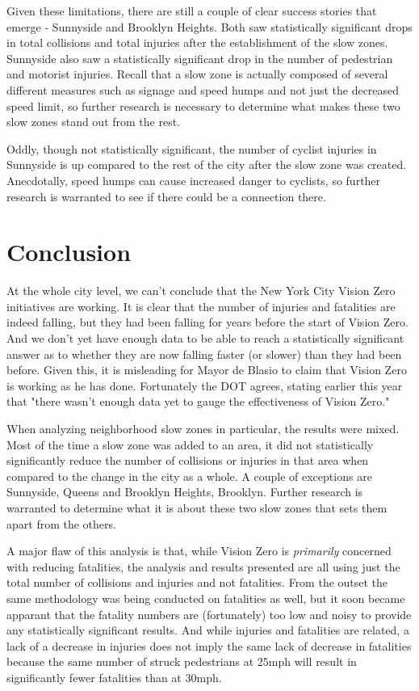 \documentclass[10pt,journal,compsoc]{IEEEtran}
\begin{document}
Given these limitations, there are still a couple of clear success stories that emerge - Sunnyside and Brooklyn Heights.  Both saw statistically significant drops in total collisions and total injuries after the establishment of the slow zones.  Sunnyside also saw a statistically significant drop in the number of pedestrian and motorist injuries.  Recall that a slow zone is actually composed of several different measures such as signage and speed humps and not just the decreased speed limit, so further research is necessary to determine what makes these two slow zones stand out from the rest.

Oddly, though not statistically significant, the number of cyclist injuries in Sunnyside is up compared to the rest of the city after the slow zone  was created.  Anecdotally, speed humps can cause increased danger to cyclists, so further research is warranted to see if there could be a connection there. 

\section{Conclusion}
At the whole city level, we can't conclude that the New York City Vision Zero initiatives are working.  It is clear that the number of injuries and fatalities are indeed falling, but they had been falling for years before the start of Vision Zero.  And we don't yet have enough data to be able to reach a statistically significant answer as to whether they are now falling faster (or slower) than they had been before.  Given this, it is misleading for Mayor de Blasio to claim that Vision Zero is working as he has done.  Fortunately the DOT agrees, stating earlier this year that "there wasn’t enough data yet to gauge the effectiveness of Vision Zero." \cite{news}

When analyzing neighborhood slow zones in particular, the results were mixed.  Most of the time a slow zone  was added to an area, it did not statistically significantly reduce the number of collisions or injuries in that area when compared to the change in the city as a whole.  A couple of exceptions are Sunnyside, Queens and Brooklyn Heights, Brooklyn. Further research is warranted to determine what it is about these two slow zones that sets them apart from the others.

A major flaw of this analysis is that, while Vision Zero is \textit{primarily} concerned with reducing fatalities, the analysis and results presented are all using just the total number of collisions and injuries and not fatalities.  From the outset the same methodology was being conducted on fatalities as well, but it soon became apparant that the fatality numbers are (fortunately) too low and noisy to provide any statistically significant results.  And while injuries and fatalities are related, a lack of a decrease in injuries does not imply the same lack of decrease in fatalities because the same number of struck pedestrians at 25mph will result in significantly fewer fatalities than at 30mph. 
\end{document}
